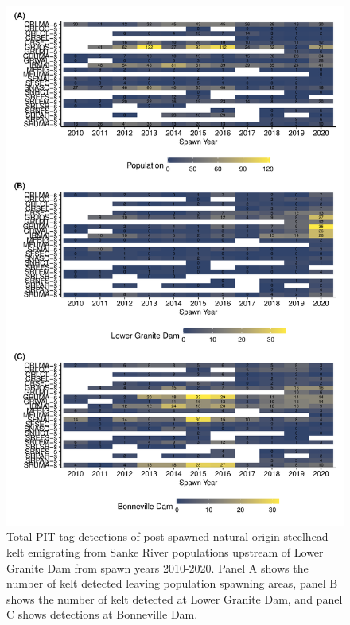 \documentclass[11pt,a4paper,]{article}
\begin{document}
\begin{figure}
\centering
\includegraphics{Kelt_Summary_files/figure-latex/plot-observed-1.pdf}
\caption{\label{fig:plot-observed}Total PIT-tag detections of post-spawned natural-origin steelhead kelt emigrating from Sanke River populations upstream of Lower Granite Dam from spawn years 2010-2020. Panel A shows the number of kelt detected leaving population spawning areas, panel B shows the number of kelt detected at Lower Granite Dam, and panel C shows detections at Bonneville Dam.}
\end{figure}
\end{document}
